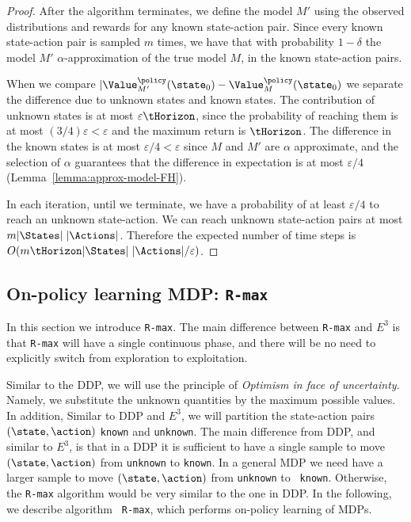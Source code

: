 \begin{proof}

After the algorithm terminates, we define the model $M'$ using the
observed distributions and rewards for any known state-action pair.
Since every known state-action pair is sampled $m$ times, we have
that with probability $1-\delta$ the model $M'$
$\alpha$-approximation of the true model $M$, in the known
state-action pairs.

When we compare
$|\Value^\policy_{M'}(\state_0)-\Value^\policy_M(\state_0)$ we
separate the difference due to unknown states and known states. The
contribution of unknown states is at most $\varepsilon\tHorizon$,
since the probability of reaching them is at most
$(3/4)\varepsilon<\varepsilon$ and the maximum return is
$\tHorizon$. The difference in the known states is at most
$\varepsilon/4<\varepsilon$ since $M$ and $M'$ are $\alpha$
approximate, and the selection of $\alpha$ guarantees that the
difference in expectation is at most $\varepsilon/4$
(Lemma~\ref{lemma:approx-model-FH}).

In each iteration, until we terminate, we have a probability of at
least $\varepsilon/4$ to reach an unknown state-action. We can reach
unknown state-action pairs at most $m |\States|\;|\Actions|$.
Therefore the expected number of time steps is  $O(m\tHorizon
|\States|\;|\Actions|/\varepsilon)$.
\end{proof}

\subsection{On-policy learning MDP: {\tt R-max}}

In this section we introduce {\tt R-max}. The main difference
between {\tt R-max} and $E^3$ is that {\tt R-max} will have a single
continuous phase, and there will be no need to explicitly switch
from exploration to exploitation.

Similar to the DDP, we will use the principle of {\em Optimism in
face of uncertainty}. Namely, we substitute the unknown quantities
by the maximum possible values.
%
In addition, Similar to DDP and $E^3$, we will partition the
state-action pairs $(\state,\action)$ {\tt known} and {\tt unknown}.
%
The main difference from DDP, and similar to $E^3$, is that in a DDP
it is sufficient to have a single sample to move $(\state,\action)$
from {\tt unknown} to {\tt known}. In a general MDP we need have a
larger sample to move $(\state,\action)$ from {\tt unknown} to {\tt
known}. Otherwise, the {\tt R-max} algorithm would be very similar
to the one in DDP. In the following, we describe algorithm {\tt
R-max}, which performs on-policy learning of MDPs.


